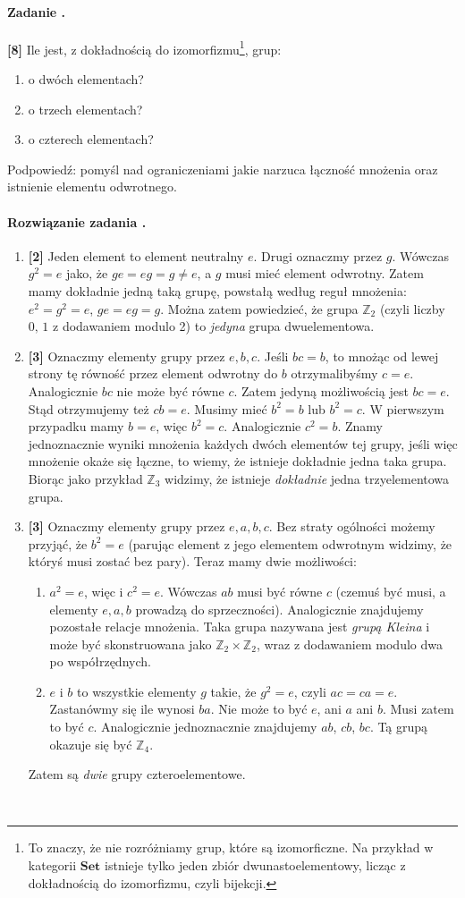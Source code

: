 \documentclass{article}
\newcounter{itemnum}
\newenvironment{prob}
{\stepcounter{itemnum}
\paragraph*{Zadanie \arabic{itemnum}.}}
{~\newline}
\newcounter{itemnum2}
\newenvironment{sol}
{\stepcounter{itemnum2}
\paragraph*{Rozwiązanie zadania \arabic{itemnum2}.}}
{~\newline}
\newcommand{\points}[1]{\textbf{[#1]}}
\newcommand{\Z}{\mathbb{Z}}
\newcommand{\Set}{\textbf{Set}}
\begin{document}
\begin{prob}
  \points{8} Ile jest, z dokładnością do izomorfizmu\footnote{To znaczy, że nie rozróżniamy grup, które są izomorficzne. Na przykład w kategorii $\Set$ istnieje tylko jeden zbiór dwunastoelementowy, licząc z dokładnością do izomorfizmu,
  czyli bijekcji.}, grup:
  \begin{enumerate}
    \item o dwóch elementach?
    \item o trzech elementach?
    \item o czterech elementach?
  \end{enumerate}
  Podpowiedź: pomyśl nad ograniczeniami jakie narzuca łączność mnożenia oraz istnienie elementu odwrotnego.
\end{prob}
\begin{sol}
  \begin{enumerate}
    \item \points{2} Jeden element to element neutralny $e$. Drugi oznaczmy przez $g$. Wówczas $g^2=e$ jako, że $ge=eg=g\neq e$, a $g$ musi mieć element odwrotny. Zatem mamy dokładnie jedną
    taką grupę, powstałą według reguł mnożenia: $e^2=g^2=e$, $ge=eg=g$. Można zatem powiedzieć, że grupa $\Z_2$ (czyli liczby $0,\, 1$ z dodawaniem modulo 2) to \emph{jedyna} grupa
    dwuelementowa.
    \item \points{3} Oznaczmy elementy grupy przez $e,b,c$. Jeśli $bc=b$, to mnożąc od lewej strony tę równość przez element odwrotny do $b$ otrzymalibyśmy $c=e$. Analogicznie $bc$ nie może
      być równe $c$. Zatem jedyną możliwością jest $bc=e$. Stąd otrzymujemy też $cb=e$. Musimy mieć $b^2=b$ lub $b^2=c$. W pierwszym przypadku mamy $b=e$, więc $b^2=c$. Analogicznie
      $c^2=b$. Znamy jednoznacznie wyniki mnożenia każdych dwóch elementów tej grupy, jeśli więc mnożenie okaże się łączne, to wiemy, że istnieje dokładnie jedna taka grupa. Biorąc
      jako przykład $\Z_3$ widzimy, że istnieje \textit{dokładnie} jedna trzyelementowa grupa.
    \item \points{3} Oznaczmy elementy grupy przez $e,a,b,c$. Bez straty ogólności możemy przyjąć, że $b^2=e$ (parując element z jego elementem odwrotnym widzimy, że któryś musi zostać
      bez pary). Teraz mamy dwie możliwości:
      \begin{enumerate}
        \item $a^2=e$, więc i $c^2=e$. Wówczas $ab$ musi być równe $c$ (czemuś być musi, a elementy $e,a,b$ prowadzą do sprzeczności). Analogicznie znajdujemy pozostałe relacje mnożenia. Taka grupa nazywana jest \textit{grupą Kleina} i może być skonstruowana jako $\Z_2\times \Z_2$, wraz z dodawaniem modulo dwa po współrzędnych.
        \item $e$ i $b$ to wszystkie elementy $g$ takie, że $g^2=e$, czyli $ac=ca=e$. Zastanówmy się ile wynosi $ba$. Nie może to być $e$, ani $a$ ani $b$. Musi zatem to być $c$.
        Analogicznie jednoznacznie znajdujemy $ab$, $cb$, $bc$. Tą grupą okazuje się być $\Z_4$.
      \end{enumerate}
      Zatem są \textit{dwie} grupy czteroelementowe.
  \end{enumerate}
\end{sol}
\end{document}
